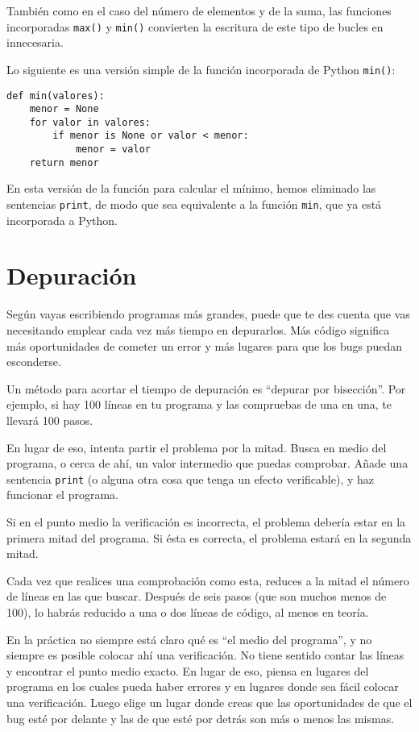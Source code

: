 También como en el caso del número de elementos y de la suma, las funciones incorporadas
{\tt max()} y {\tt min()} convierten la escritura de este tipo de bucles
en innecesaria.

Lo siguiente es una versión simple de la función incorporada de Python
{\tt min()}:

\beforeverb
\begin{verbatim}
def min(valores):
    menor = None
    for valor in valores:
        if menor is None or valor < menor:
            menor = valor
    return menor
\end{verbatim}
\afterverb
%
En esta versión de la función para calcular el mínimo, hemos eliminado las
sentencias {\tt print}, de modo que sea equivalente a la función {\tt min},
que ya está incorporada a Python.

\section{Depuración}

Según vayas escribiendo programas más grandes, puede que te des cuenta que vas necesitando
emplear cada vez más tiempo en depurarlos. Más código significa más oportunidades de
cometer un error y más lugares para que los bugs puedan esconderse.


Un método para acortar el tiempo de depuración es ``depurar por bisección''.
Por ejemplo, si hay 100 líneas en tu programa y las compruebas
de una en una, te llevará 100 pasos.

En lugar de eso, intenta partir el problema por la mitad. Busca en medio
del programa, o cerca de ahí, un valor intermedio que puedas
comprobar. Añade una sentencia {\tt print} (o alguna otra cosa
que tenga un efecto verificable), y haz funcionar el programa.

Si en el punto medio la verificación es incorrecta, el problema debería
estar en la primera mitad del programa. Si ésta es correcta, el problema
estará en la segunda mitad.

Cada vez que realices una comprobación como esta, reduces a la mitad el número
de líneas en las que buscar. Después de seis pasos (que son muchos
menos de 100), lo habrás reducido a una o dos líneas de código,
al menos en teoría.

En la práctica no siempre está claro qué es
``el medio del programa'', y no siempre es posible colocar ahí
una verificación. No tiene sentido contar las líneas y encontrar
el punto medio exacto. En lugar de eso, piensa en lugares del programa
en los cuales pueda haber errores y en lugares donde sea fácil colocar una verificación.
Luego elige un lugar donde creas que las oportunidades de que el bug
esté por delante y las de que esté por detrás son más o menos las mismas.

